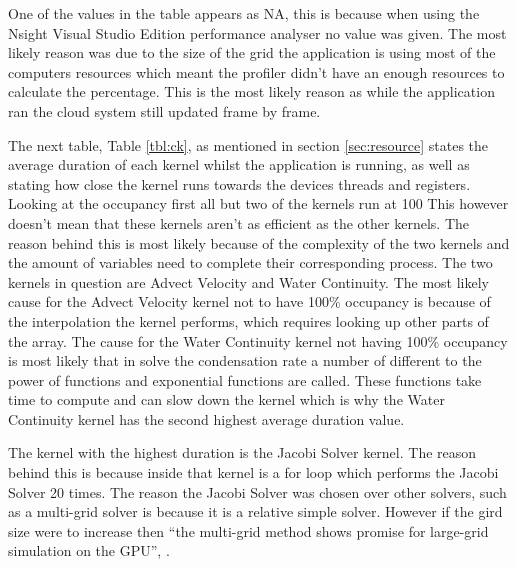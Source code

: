 One of the values in the table appears as NA, this is because when using the Nsight Visual Studio Edition performance analyser no value was given.
The most likely reason was due to the size of the grid the application is using most of the computers resources which meant the profiler didn't have an enough resources to calculate the percentage.
This is the most likely reason as while the application ran the cloud system still updated frame by frame.

The next table, Table \ref{tbl:ck}, as mentioned in section \ref{sec:resource} states the average duration of each kernel whilst the application is running, as well as stating how close the kernel runs towards the devices threads and registers.
Looking at the occupancy first all but two of the kernels run at 100%
This however doesn't mean that these kernels aren't as efficient as the other kernels.
The reason behind this is most likely because of the complexity of the two kernels and the amount of variables need to complete their corresponding process. The two kernels in question are Advect Velocity and Water Continuity.
The most likely cause for the Advect Velocity kernel not to have 100\% occupancy is because of the interpolation the kernel performs, which requires looking up other parts of the array.
The cause for the Water Continuity kernel not having 100\% occupancy is most likely that in solve the condensation rate a number of different to the power of functions and exponential functions are called.
These functions take time to compute and can slow down the kernel which is why the Water Continuity kernel has the second highest average duration value. 

The kernel with the highest duration is the Jacobi Solver kernel.
The reason behind this is because inside that kernel is a for loop which performs the Jacobi Solver 20 times.
The reason the Jacobi Solver was chosen over other solvers, such as a multi-grid solver is because it is a relative simple solver.
However if the gird size were to increase then “the multi-grid method shows promise for large-grid simulation on the GPU”, \citep{HarrisEtAl03}.